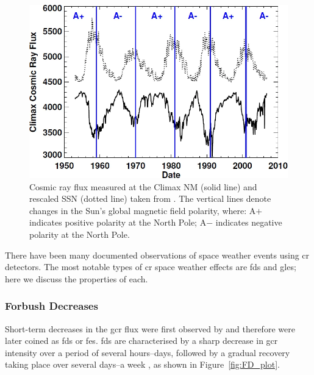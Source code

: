 \begin{figure}[ht!]
	\centering
	\includegraphics[width=0.95\columnwidth]{gcr.png}
	\caption{Cosmic ray flux measured at the Climax NM (solid line) and rescaled SSN (dotted line) taken from \citet{hathaway_solar_2015}. The vertical lines denote changes in the Sun's global magnetic field polarity, where: A$+$ indicates positive polarity at the North Pole; A$-$ indicates negative polarity at the North Pole.}
	\label{fig:gcr_plot}
\end{figure}

There have been many documented observations of space weather events using \gls{cr} detectors. The most notable types of \gls{cr} space weather effects are \glspl{fd} and \glspl{gle}; here we discuss the properties of each.

\subsubsection*{Forbush Decreases}\label{sec:intro_FDs}

Short-term decreases in the \gls{gcr} flux were first observed by  \citet{forbush_effects_1937} and therefore were later coined as \glspl{fd} or \glspl{fe}. \glspl{fd} are characterised by a sharp decrease in \gls{gcr} intensity over a period of several hours--days, followed by a gradual recovery taking place over several days--a week \citep{cane_coronal_2000, belov_forbush_2008, wawrzynczak_modeling_2010}, as shown in Figure~\ref{fig:FD_plot}.

